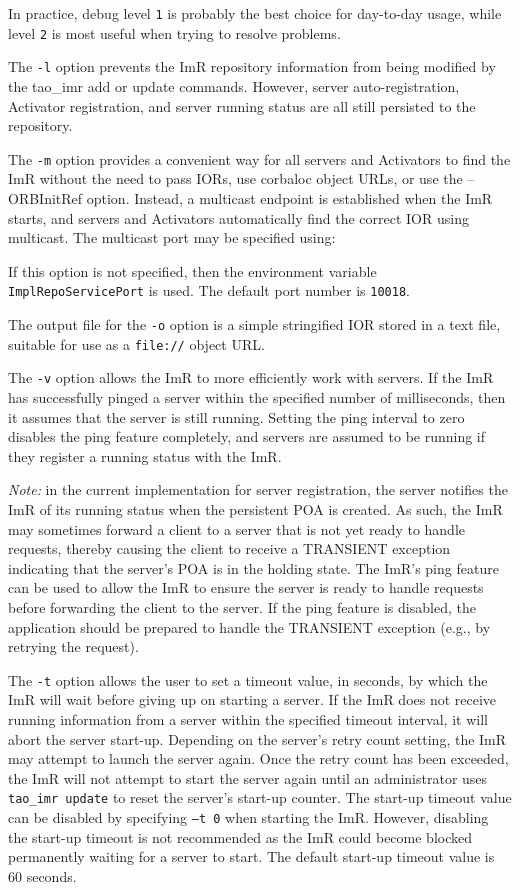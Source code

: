 In practice, debug level {\tt 1} is probably the best choice for day-to-day usage, while level {\tt 2} is most
useful when trying to resolve problems.

The {\tt -l} option prevents the ImR repository information from being modified by the tao\_imr add or
update commands. However, server auto-registration, Activator registration, and server running status are
all still persisted to the repository.

The {\tt -m} option provides a convenient way for all servers and Activators to find the ImR without
the need to pass IORs, use corbaloc object URLs, or use the –ORBInitRef option. Instead, a multicast
endpoint is established when the ImR starts, and servers and Activators automatically find the correct
IOR using multicast. The multicast port may be specified using:


If this option is not specified, then the environment variable {\tt ImplRepoServicePort} is used. The
default port number is {\tt 10018}.

The output file for the {\tt -o} option is a simple stringified IOR stored in a text file, suitable for use as a
{\tt file://} object URL.

The {\tt -v} option allows the ImR to more efficiently work with servers. If the ImR has successfully
pinged a server within the specified number of milliseconds, then it assumes that the server is still
running.  Setting the ping interval to zero disables the ping feature completely, and servers are assumed
to be running if they register a running status with the ImR.

\emph {Note:}  in the current implementation for server registration, the server notifies the ImR of its
running status when the persistent POA is created. As such, the ImR may sometimes forward a client to
a server that is not yet ready to handle requests, thereby causing the client to receive a TRANSIENT
exception indicating that the server’s POA is in the holding state. The ImR’s ping feature can be used
to allow the ImR to ensure the server is ready to handle requests before forwarding the client to the
server. If the ping feature is disabled, the application should be prepared to handle the TRANSIENT
exception (e.g., by retrying the request).

The {\tt -t} option allows the user to set a timeout value, in seconds, by which the ImR will wait before
giving up on starting a server. If the ImR does not receive running information from a server within the
specified timeout interval, it will abort the server start-up. Depending on the server’s retry count setting,
the ImR may attempt to launch the server again. Once the retry count has been exceeded, the ImR will
not attempt to start the server again until an administrator uses {\tt tao\_imr update} to reset the server’s
 start-up counter. The start-up timeout value can be disabled by specifying {\tt–t 0} when starting the ImR.
However, disabling the start-up timeout is not recommended as the ImR could become blocked
permanently waiting for a server to start. The default start-up timeout value is 60 seconds.

